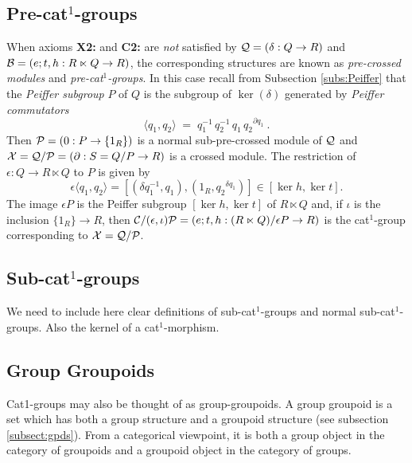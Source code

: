 \subsection{Pre-cat$^1$-groups}  

When axioms \textbf{X2:} and \textbf{C2:} are \emph{not} satisfied
by  $\mathcal{Q} = (\delta : Q \to R)$  and  
$\mathcal{B} = (e;t,h : R \ltimes Q \to R)$,
the corresponding structures are known as \emph{pre-crossed modules}
and \emph{pre-cat$^1$-groups}.
In this case recall from Subsection \ref{subs:Peiffer}
that the \emph{Peiffer subgroup}  $P$  of  $Q$  is the subgroup of
$\ker(\delta)$  generated by \emph{Peiffer commutators}
$$
\langle q_1, q_2 \rangle 
\;=\; 
q_1^{-1}\,q_2^{-1}\,q_1\,{q_2}^{\partial q_1}~.
$$
Then  $\mathcal{P} = (0 : P \to \{1_R\})$  
is a normal sub-pre-crossed module of  $\mathcal{Q}$  and  
$\mathcal{X} = \mathcal{Q}/\mathcal{P} = (\partial : S=Q/P \to R)$  is a crossed module.
The restriction of  $\epsilon : Q \to R \ltimes Q$  to  $P$  is given by
$$
   \epsilon \langle q_1, q_2 \rangle
 = [ (\delta q_1^{-1}, q_1), (1_R, {q_2}^{\delta q_1}) ]
 \in  [ \ker h, \ker t ].
$$
The image  $\epsilon P$  is the Peiffer subgroup
$[\ker h, \ker t]$  of  $R \ltimes Q$
and, if  $\iota$  is the inclusion  $\{ 1_R \} \to R$,  then
$\mathcal{C}/(\epsilon,\iota)\mathcal{P} = 
 (e;t,h : (R \ltimes Q) / \epsilon P \to R)$
is the cat$^1$-group corresponding to  $\mathcal{X} = \mathcal{Q}/\mathcal{P}$.


\subsection{Sub-cat$^1$-groups} \label{subs:sub-cat1} 

We need to include here clear definitions of sub-cat$^1$-groups 
and normal sub-cat$^1$-groups. 
Also the kernel of a cat$^1$-morphism. 



\subsection{Group Groupoids} \label{subs:gpgpd}  

Cat1-groups may also be thought of as group-groupoids.
A group groupoid is a set which has both a group structure and
a groupoid structure (see subsection \ref{subsect:gpds}). 
From a categorical viewpoint, it is both a group object in the
category of groupoids and a groupoid object in the category of groups.


